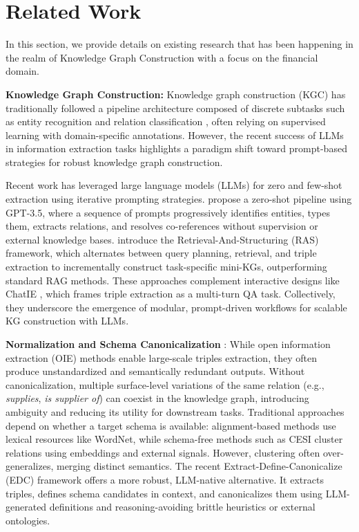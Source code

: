 \section{Related Work}
In this section, we provide details on existing research that has been happening in the realm of Knowledge Graph Construction with a focus on the financial domain. 

\textbf{Knowledge Graph Construction:} 
Knowledge graph construction (KGC) has traditionally followed a pipeline architecture composed of discrete subtasks such as entity recognition \cite{zukov2018neural, martins2019joint} and relation classification \cite{zeng2014relation, zeng2015distant}, often relying on supervised learning with domain-specific annotations. However, the recent success of LLMs in information extraction tasks \cite{li2023evaluating} highlights a paradigm shift toward prompt-based strategies for robust knowledge graph construction.

Recent work has leveraged large language models (LLMs) for zero and few-shot extraction using iterative prompting strategies. \citet{carta2023iterative} propose a zero-shot pipeline using GPT-3.5, where a sequence of prompts progressively identifies entities, types them, extracts relations, and resolves co-references without supervision or external knowledge bases. \citet{jiang2025ras} introduce the Retrieval-And-Structuring (RAS) framework, which alternates between query planning, retrieval, and triple extraction to incrementally construct task-specific mini-KGs, outperforming standard RAG methods. These approaches complement interactive designs like ChatIE \cite{wei2023chatie}, which frames triple extraction as a multi-turn QA task. Collectively, they underscore the emergence of modular, prompt-driven workflows for scalable KG construction with LLMs.

\textbf{Normalization and Schema Canonicalization} : 
While open information extraction (OIE) methods enable large-scale triples extraction, they often produce unstandardized and semantically redundant outputs. Without canonicalization, multiple surface-level variations of the same relation (e.g., \textit{supplies}, \textit{is supplier of}) can coexist in the knowledge graph, introducing ambiguity and reducing its utility for downstream tasks.
Traditional approaches depend on whether a target schema is available: alignment-based methods use lexical resources like WordNet, while schema-free methods such as CESI \cite{vashishth2018cesi} cluster relations using embeddings and external signals. However, clustering often over-generalizes, merging distinct semantics. The recent Extract-Define-Canonicalize (EDC) framework \cite{zhang2024extract} offers a more robust, LLM-native alternative. It extracts triples, defines schema candidates in context, and canonicalizes them using LLM-generated definitions and reasoning-avoiding brittle heuristics or external ontologies.


